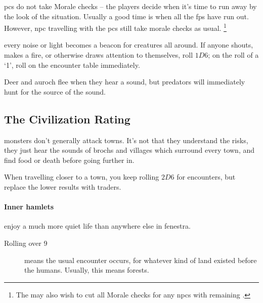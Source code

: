 \begin{multicols}{2}
\Glspl{pc} do not take Morale checks -- the players decide when it's time to run away by the look of the situation.
Usually a good time is when all the \glspl{fp} have run out.
%
However, \gls{npc} travelling with the \glspl{pc} still take morale checks as usual.%
\footnote{The  may also wish to cut all Morale checks for any \glspl{npc} with remaining .}%

every noise or light becomes a beacon for creatures all around.
If anyone shouts, makes a fire, or otherwise draws attention to themselves, roll $1D6$; on the roll of a `1', roll on the encounter table immediately.

Deer and auroch flee when they hear a sound, but predators will immediately hunt for the source of the sound.

\setcounter{enc}{19}
\begin{boxtable}[rXc|L]
\end{boxtable}

\subsection{The Civilization Rating}
\label{civilizationRating}

\Glspl{monster} don't generally attack towns.
It's not that they understand the risks, they just hear the sounds of \glspl{broch} and \glspl{village} which surround every town, and find food or death before going further in.

When travelling closer to a town, you keep rolling $2D6$ for encounters, but replace the lower results with traders.

\paragraph{Inner hamlets}
enjoy a much more quiet life than anywhere else in \gls{fenestra}.

\null
\begin{description}
  \item[Rolling over 9]
  means the usual encounter occurs, for whatever kind of land existed before the humans.
  Usually, this means forests.


\end{description}
\end{multicols}
